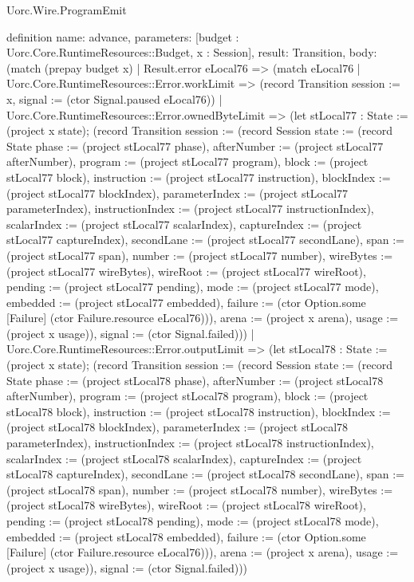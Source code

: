\begin{lexlean}{Uorc.Wire.ProgramEmit}
\begin{semanticmodule}
definition{
  name: advance,
  parameters: [budget : Uorc.Core.RuntimeResources::Budget, x : Session],
  result: Transition,
  body: (match (prepay budget x)
    | Result.error eLocal76 => (match eLocal76
      | Uorc.Core.RuntimeResources::Error.workLimit => (record Transition {session := x, signal := (ctor Signal.paused eLocal76)})
      | Uorc.Core.RuntimeResources::Error.ownedByteLimit => (let stLocal77 : State := (project x state); (record Transition {session := (record Session {state := (record State {phase := (project stLocal77 phase), afterNumber := (project stLocal77 afterNumber), program := (project stLocal77 program), block := (project stLocal77 block), instruction := (project stLocal77 instruction), blockIndex := (project stLocal77 blockIndex), parameterIndex := (project stLocal77 parameterIndex), instructionIndex := (project stLocal77 instructionIndex), scalarIndex := (project stLocal77 scalarIndex), captureIndex := (project stLocal77 captureIndex), secondLane := (project stLocal77 secondLane), span := (project stLocal77 span), number := (project stLocal77 number), wireBytes := (project stLocal77 wireBytes), wireRoot := (project stLocal77 wireRoot), pending := (project stLocal77 pending), mode := (project stLocal77 mode), embedded := (project stLocal77 embedded), failure := (ctor Option.some [Failure] (ctor Failure.resource eLocal76))}), arena := (project x arena), usage := (project x usage)}), signal := (ctor Signal.failed)}))
      | Uorc.Core.RuntimeResources::Error.outputLimit => (let stLocal78 : State := (project x state); (record Transition {session := (record Session {state := (record State {phase := (project stLocal78 phase), afterNumber := (project stLocal78 afterNumber), program := (project stLocal78 program), block := (project stLocal78 block), instruction := (project stLocal78 instruction), blockIndex := (project stLocal78 blockIndex), parameterIndex := (project stLocal78 parameterIndex), instructionIndex := (project stLocal78 instructionIndex), scalarIndex := (project stLocal78 scalarIndex), captureIndex := (project stLocal78 captureIndex), secondLane := (project stLocal78 secondLane), span := (project stLocal78 span), number := (project stLocal78 number), wireBytes := (project stLocal78 wireBytes), wireRoot := (project stLocal78 wireRoot), pending := (project stLocal78 pending), mode := (project stLocal78 mode), embedded := (project stLocal78 embedded), failure := (ctor Option.some [Failure] (ctor Failure.resource eLocal76))}), arena := (project x arena), usage := (project x usage)}), signal := (ctor Signal.failed)}))
}
\end{semanticmodule}
\end{lexlean}
